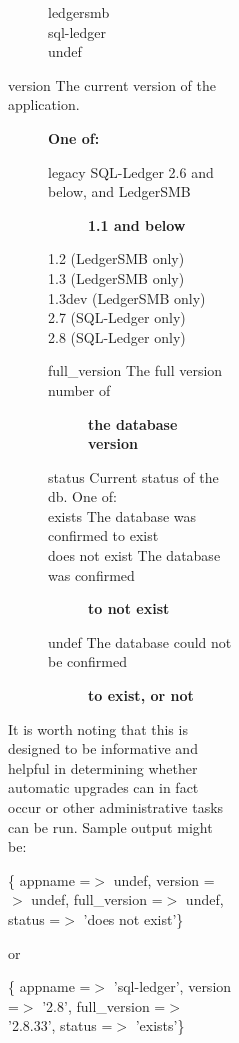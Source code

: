 \begin{description}
\begin{description}
\begin{description}
\begin{description}
\begin{description}
\begin{description}
\begin{description}
\begin{description}
\begin{description}
\item[{ledgersmb}] \mbox{}
\item[{sql-ledger}] \mbox{}
\item[{undef}] \mbox{}\end{description}

\item[{version The current version of the application.}] \textbf{One of:}\begin{description}

\item[{legacy SQL-Ledger 2.6 and below, and LedgerSMB}] \textbf{1.1 and below}
\item[{1.2 (LedgerSMB only)}] \mbox{}
\item[{1.3 (LedgerSMB only)}] \mbox{}
\item[{1.3dev (LedgerSMB only)}] \mbox{}
\item[{2.7 (SQL-Ledger only)}] \mbox{}
\item[{2.8 (SQL-Ledger only)}] \mbox{}\end{description}
\begin{description}

\item[{full\_version The full version number of}] \textbf{the database version}
\item[{status Current status of the db. One of:}] \mbox{}
\item[{exists The database was confirmed to exist}] \mbox{}
\item[{does not exist The database was confirmed}] \textbf{to not exist}
\item[{undef The database could not be confirmed}] \textbf{to exist, or not}\end{description}
\end{description}


It is worth noting that this is designed to be informative and helpful in 
determining whether automatic upgrades can in fact occur or other 
administrative tasks can be run.  Sample output might be:



\{    appname =$>$ undef, 
     version =$>$ undef, 
full\_version =$>$ undef,
      status =$>$ 'does not exist'\}



or



\{    appname =$>$ 'sql-ledger',
     version =$>$ '2.8',
full\_version =$>$ '2.8.33',
      status =$>$ 'exists'\}




\end{description}
\end{description}
\end{description}
\end{description}
\end{description}
\end{description}
\end{description}
